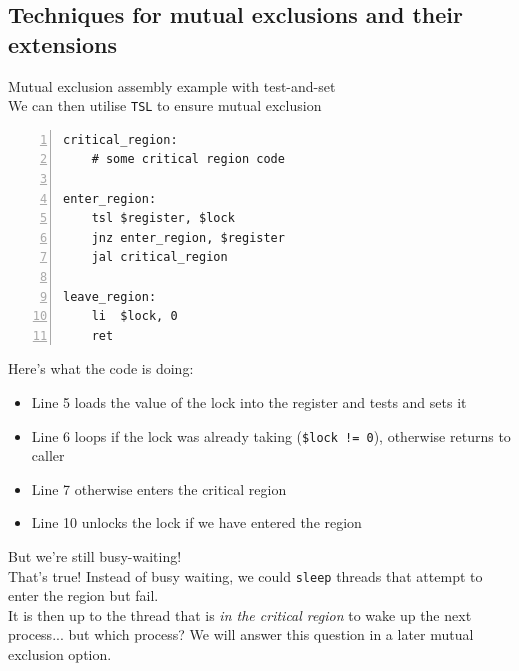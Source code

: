 \documentclass[journal, letterpaper]{IEEEtran}
\begin{document}
\subsection{Techniques for mutual exclusions and their extensions}
\begin{example}{Mutual exclusion assembly example with test-and-set} \\
    We can then utilise \verb|TSL| to ensure mutual exclusion
    \begin{Verbatim}[numbers=left, numbersep=2mm, frame=single]
critical_region:
    # some critical region code

enter_region:
    tsl $register, $lock
    jnz enter_region, $register
    jal critical_region

leave_region:
    li  $lock, 0
    ret
    \end{Verbatim}
    Here's what the code is doing:
    \begin{itemize}
        \item Line 5 loads the value of the lock into the register and tests and sets it
        \item Line 6 loops if the lock was already taking (\verb|$lock != 0|), otherwise returns to caller
        \item Line 7 otherwise enters the critical region
        \item Line 10 unlocks the lock if we have entered the region
    \end{itemize}
\end{example}
\begin{aside}{But we're still busy-waiting!} \\
    That's true! Instead of busy waiting, we could \verb|sleep| threads that attempt to enter the region but fail.
    \newline \\ 
    It is then up to the thread that is \textit{in the critical region} to wake up the next process... but which process? We will answer this question in a later mutual exclusion option.
\end{aside}
\end{document}
